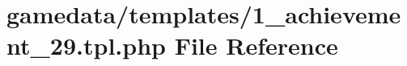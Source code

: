 \hypertarget{1__achievement__29_8tpl_8php}{\section{gamedata/templates/1\+\_\+achievement\+\_\+29.tpl.\+php File Reference}
\label{1__achievement__29_8tpl_8php}
}
